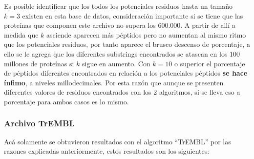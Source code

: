 Es posible identificar que los todos los potenciales residuos hasta un tamaño $k=3$ existen en esta base de datos, consideración importante si se tiene que las proteínas que componen este archivo no supera los 600.000. A partir de allí a medida que $k$ asciende aparecen más péptidos pero no aumentan al mismo ritmo que los potenciales residuos, por tanto aparece el brusco descenso de porcentaje, a ello se le agrega que los diferentes substrings encontrados se atascan en los 100 millones de proteínas si $k$ sigue en aumento. Con $k=10$ o superior el porcentaje de péptidos diferentes encontrados en relación a los potenciales péptidos \textbf{se hace ínfimo}, a niveles millodecimales. Por esta razón que aunque se presenten diferentes valores de residuos encontrados con los 2 algoritmos, si se lleva eso a porcentaje para ambos casos es lo mismo.

\subsubsection{Archivo TrEMBL}

Acá solamente se obtuvieron resultados con el algoritmo ``TrEMBL'' por las razones explicadas anteriormente, estos resultados son los siguientes:


